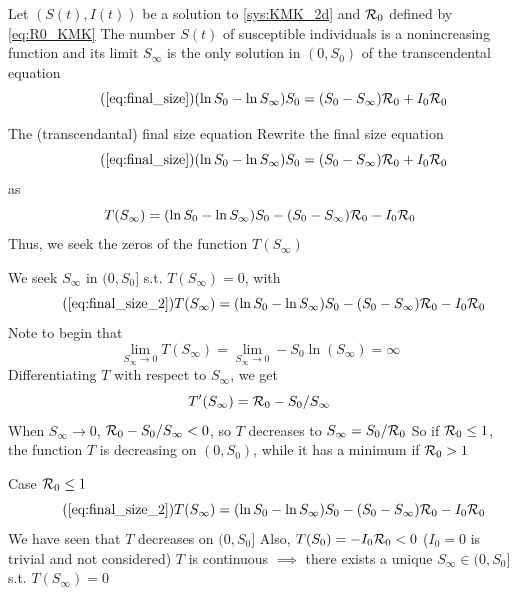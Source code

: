 \documentclass[aspectratio=169]{beamer}\usepackage[]{graphicx}\usepackage[]{xcolor}
\begin{document}
\begin{frame}{}
\begin{theorem}
  Let $(S(t),I(t))$ be a solution to \eqref{sys:KMK_2d} and $\mathcal{R}_0$ defined by \eqref{eq:R0_KMK}
  \vskip0.5cm
  The number $S(t)$ of susceptible individuals is a nonincreasing function and its limit $S_\infty$ is the only solution in $(0,S_0)$ of the transcendental equation
  \begin{equation}\tag{\ref{eq:final_size}}
  (\ln S_0-\ln S_\infty)S_0 = (S_0-S_\infty)\R_0+I_0\R_0
  \end{equation}
\end{theorem}
\end{frame}



\begin{frame}{The (transcendantal) final size equation}
  Rewrite the final size equation
  \begin{equation}
    \tag{\ref{eq:final_size}}
  (\ln S_0-\ln S_\infty)S_0 = (S_0-S_\infty)\R_0+I_0\R_0
  \end{equation}
  as
  \begin{equation}
  \label{eq:final_size_2}
  T(S_\infty) =(\ln S_0-\ln S_\infty)S_0
  - (S_0-S_\infty)\mathcal{R}_0 -I_0\mathcal{R}_0
\end{equation}
\vfill
Thus, we seek the zeros of the function $T(S_\infty)$
\end{frame}



\begin{frame}{}
  We seek $S_\infty$ in $(0,S_0]$ s.t. $T(S_\infty)=0$, with
  \begin{equation}\tag{\ref{eq:final_size_2}}
    T(S_\infty) =(\ln S_0-\ln S_\infty)S_0
    - (S_0-S_\infty)\R_0 -I_0\R_0      
  \end{equation}
  \vfill
  Note to begin that 
  $$
  \lim_{S_\infty\to 0}T(S_\infty)=\lim_{S_\infty\to 0}-S_0\ln(S_\infty)=\infty
  $$
  \vfill
  Differentiating $T$ with respect to $S_\infty$, we get 
  $$
  T'(S_\infty)=\mathcal{R}_0-S_0/S_\infty
  $$ 
  \vfill
  When $S_\infty\to 0$, $\mathcal{R}_0-S_0/S_\infty<0$, so $T$ decreases to $S_\infty=S_0/\mathcal{R}_0$
  \vfill
  So if $\mathcal{R}_0\leq 1$, the function $T$ is decreasing on $(0,S_0)$, while it has a minimum if $\mathcal{R}_0>1$
\end{frame}



\begin{frame}{Case $\mathcal{R}_0\leq 1$}
  \begin{equation}\tag{\ref{eq:final_size_2}}
    T(S_\infty) =(\ln S_0-\ln S_\infty)S_0
    - (S_0-S_\infty)\R_0 -I_0\R_0      
  \end{equation}
  \vfill
  \bbullet We have seen that $T$ decreases on $(0,S_0]$
  \vfill
  \bbullet Also, $T(S_0)=-I_0\mathcal{R}_0<0$ ($I_0=0$ is trivial and not considered)
  \vfill
  \bbullet $T$ is continuous
  \vfill
  $\implies$ there exists a unique $S_\infty\in (0,S_0]$ s.t. $T(S_\infty)=0$
\end{frame}
\end{document}

